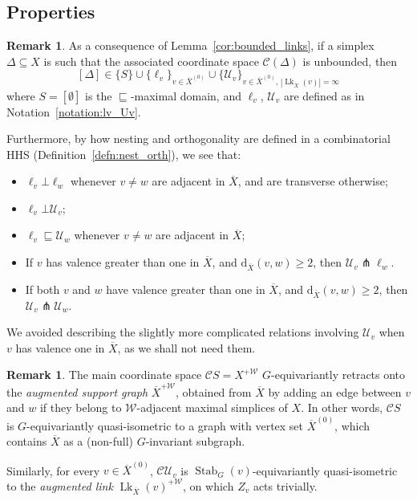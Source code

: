 \documentclass[svgnames]{amsart}
\theoremstyle{plain}
\theoremstyle{definition}
\newtheorem{rem}[thm]{Remark}
\newcommand{\C}{\mathcal C}
\newcommand{\ov}[1]{\overline{#1}}
\newcommand{\U}{\mathcal{U}}
\newcommand{\dist}{\mathrm{d}}
\newcommand{\nest}{\sqsubseteq}
\newcommand{\orth}{\bot}
\newcommand{\transverse}{\pitchfork}
\newcommand{\link}{\operatorname{Lk}}
\newcommand{\Stab}[2]{\operatorname{Stab}_{#1}(#2)}
\newcommand{\W}{\mathcal{W}}
\begin{document}
\subsection{Properties}

\begin{rem}\label{rem:unbounded_dom_short_hhg}
    As a consequence of Lemma~\ref{cor:bounded_links}, if a simplex $\Delta\subseteq X$ is such that the associated coordinate space $\C (\Delta)$ is unbounded, then $$[\Delta]\in\{S\}\cup\{\ell_v\}_{v\in\ov{X}^{(0)}}\cup \{\U_v\}_{v\in\ov{X}^{(0)},\,|\link_{\ov X}(v)|=\infty}$$
    where $S=[\emptyset]$ is the $\nest$-maximal domain, and $\ell_v$, $\U_v$ are defined as in Notation~\ref{notation:lv_Uv}.
    
    Furthermore, by how nesting and orthogonality are defined in a combinatorial HHS (Definition~\ref{defn:nest_orth}), we see that:
    \begin{itemize}
        \item $\ell_v\orth \ell_w$ whenever $v\neq w$ are adjacent in $\ov X$, and are transverse otherwise; 
        \item $\ell_v\orth \U_v$; 
        \item $\ell_v\nest \U_w$ whenever $v\neq w$ are adjacent in $\ov X$;
        \item If $v$ has valence greater than one in $\ov X$, and $\dist_{\ov X}(v,w)\ge 2$, then $\U_v\transverse \ell_w$.
        \item If both $v$ and $w$ have valence greater than one in $\ov X$, and $\dist_{\ov X}(v,w)\ge 2$, then $\U_v\transverse \U_w$.
    \end{itemize}
    We avoided describing the slightly more complicated relations involving $\U_v$ when $v$ has valence one in $\ov X$, as we shall not need them.
\end{rem}



\begin{rem}\label{rem:coord_spaces_wrt_lines}
 The main coordinate space $\C S=X^{+\W}$ $G$-equivariantly retracts onto the \emph{augmented support graph} $\ov X^{+\W}$, obtained from $\ov{X}$ by adding an edge between $v$ and $w$ if they belong to $\W$-adjacent maximal simplices of $X$. In other words, $\C S$ is $G$-equivariantly quasi-isometric to a graph with vertex set $\ov X^{(0)}$, which contains $\ov X$ as a (non-full) $G$-invariant subgraph.
 
Similarly, for every $v\in \ov{X}^{(0)}$, $\C \U_v$ is $\Stab{G}{v}$-equivariantly quasi-isometric to the \emph{augmented link} $\link_{\ov{X}}(v)^{+\W}$, on which $Z_v$ acts trivially.
  \end{rem}
\end{document}
